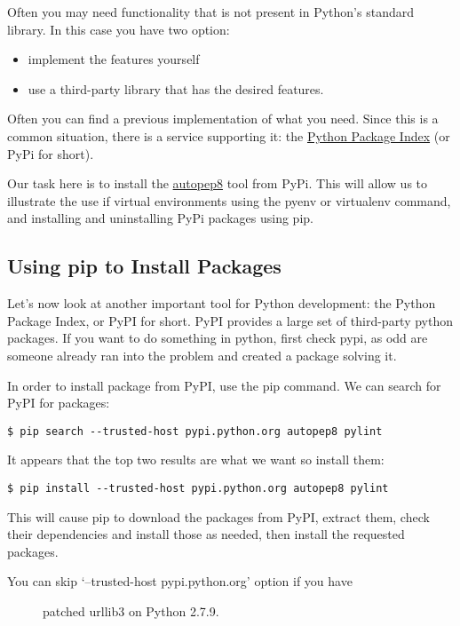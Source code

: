 Often you may need functionality that is not present in Python's
standard library. In this case you have two option:

\begin{itemize}

\item
  implement the features yourself
\item
  use a third-party library that has the desired features.
\end{itemize}

Often you can find a previous implementation of what you need. Since
this is a common situation, there is a service supporting it: the
\href{https://pypi.python.org/pypi}{Python Package Index} (or PyPi for
short).

Our task here is to install the \href{}{autopep8} tool from PyPi. This
will allow us to illustrate the use if virtual environments using the
pyenv or virtualenv command, and installing and uninstalling PyPi
packages using pip.

\subsection{Using pip to Install
Packages}\label{using-pip-to-install-packages}

Let's now look at another important tool for Python development: the
Python Package Index, or PyPI for short. PyPI provides a large set of
third-party python packages. If you want to do something in python,
first check pypi, as odd are someone already ran into the problem and
created a package solving it.

In order to install package from PyPI, use the pip command. We can
search for PyPI for packages:

\begin{verbatim}
$ pip search --trusted-host pypi.python.org autopep8 pylint
\end{verbatim}

It appears that the top two results are what we want so install them:

\begin{verbatim}
$ pip install --trusted-host pypi.python.org autopep8 pylint
\end{verbatim}

This will cause pip to download the packages from PyPI, extract them,
check their dependencies and install those as needed, then install the
requested packages.

\begin{description}
\item[You can skip `--trusted-host pypi.python.org' option if you have]
patched urllib3 on Python 2.7.9.
\end{description}

